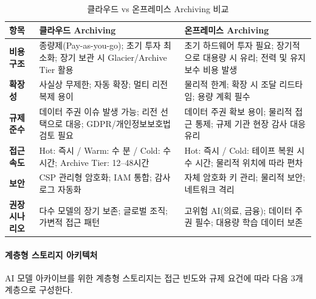 \begin{table}[htbp]
\centering
\caption{클라우드 vs 온프레미스 Archiving 비교}
\label{tab:cloud_vs_onprem_archive}
\begin{tabularx}{\textwidth}{p{2.5cm}XX}
\toprule
\textbf{항목} & \textbf{클라우드 Archiving} & \textbf{온프레미스 Archiving} \\
\midrule
\textbf{비용 구조} &
종량제(Pay-as-you-go); 초기 투자 최소화; 장기 보관 시 Glacier/Archive Tier 활용 &
초기 하드웨어 투자 필요; 장기적으로 대용량 시 유리; 전력 및 유지보수 비용 발생 \\
\midrule
\textbf{확장성} &
사실상 무제한; 자동 확장; 멀티 리전 복제 용이 &
물리적 한계; 확장 시 조달 리드타임; 용량 계획 필수 \\
\midrule
\textbf{규제 준수} &
데이터 주권 이슈 발생 가능; 리전 선택으로 대응; GDPR/개인정보보호법 검토 필요 &
데이터 주권 확보 용이; 물리적 접근 통제; 규제 기관 현장 감사 대응 유리 \\
\midrule
\textbf{접근 속도} &
Hot: 즉시 / Warm: 수 분 / Cold: 수 시간; Archive Tier: 12--48시간 &
Hot: 즉시 / Cold: 테이프 복원 시 수 시간; 물리적 위치에 따라 편차 \\
\midrule
\textbf{보안} &
CSP 관리형 암호화; IAM 통합; 감사 로그 자동화 &
자체 암호화 키 관리; 물리적 보안; 네트워크 격리 \\
\midrule
\textbf{권장 시나리오} &
다수 모델의 장기 보존; 글로벌 조직; 가변적 접근 패턴 &
고위험 AI(의료, 금융); 데이터 주권 필수; 대용량 학습 데이터 보존 \\
\bottomrule
\end{tabularx}
\end{table}

\paragraph{계층형 스토리지 아키텍처}
AI 모델 아카이브를 위한 계층형 스토리지는 접근 빈도와 규제 요건에 따라 다음 3개 계층으로 구성한다.

